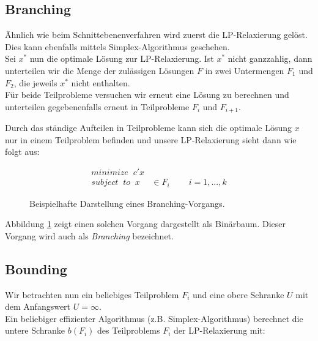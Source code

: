 \documentclass[tog]{acmsiggraph}
\begin{document}
\subsection*{Branching}

Ähnlich wie beim Schnittebenenverfahren wird zuerst die LP-Relaxierung gelöst. Dies kann ebenfalls mittels Simplex-Algorithmus geschehen.\\
Sei $x^*$ nun die optimale Lösung zur LP-Relaxierung. Ist $x^*$ nicht ganzzahlig, dann unterteilen wir die Menge der zulässigen Lösungen $F$ in zwei Untermengen $F_1$ und $F_2$, die jeweils $x^*$ nicht enthalten.\\
Für beide Teilprobleme versuchen wir erneut eine Lösung zu berechnen und unterteilen gegebenenfalls erneut in Teilprobleme $F_i$ und $F_{i+1}$.

Durch das ständige Aufteilen in Teilprobleme kann sich die optimale Lösung $x$ nur in einem Teilproblem befinden und unsere LP-Relaxierung sieht dann wie folgt aus:

\large
\begin{align}
\label{Eq:Branching-Teilprobleme-Grundlage}
minimize \;\; c'x & \nonumber \\
subject \;\; to \;\; x &\in F_i \;\;\;\;\;\;\;\; i=1,...,k
\end{align}
\normalsize

\begin{figure}[ht]
\centering
{}
\caption{Beispielhafte Darstellung eines Branching-Vorgangs.}
\label{fig:Branching-Baum}
\end{figure}

Abbildung \ref{fig:Branching-Baum} zeigt einen solchen Vorgang dargestellt als Binärbaum. Dieser Vorgang wird auch als \textit{Branching} bezeichnet.

\subsection*{Bounding}

Wir betrachten nun ein beliebiges Teilproblem $F_i$ und eine obere Schranke $U$ mit dem Anfangswert $U = \infty$. \\
Ein beliebiger effizienter Algorithmus (z.B. Simplex-Algorithmus) berechnet die untere Schranke $b(F_i)$ des Teilproblems $F_i$ der LP-Relaxierung mit:
\end{document}
